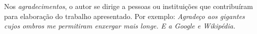 Nos \emph{agradecimentos}, o autor se dirige a pessoas ou instituições que
contribuíram para elaboração do trabalho apresentado. Por exemplo: \emph{Agradeço aos gigantes cujos
ombros me permitiram enxergar mais longe. E a Google e Wikipédia.}
